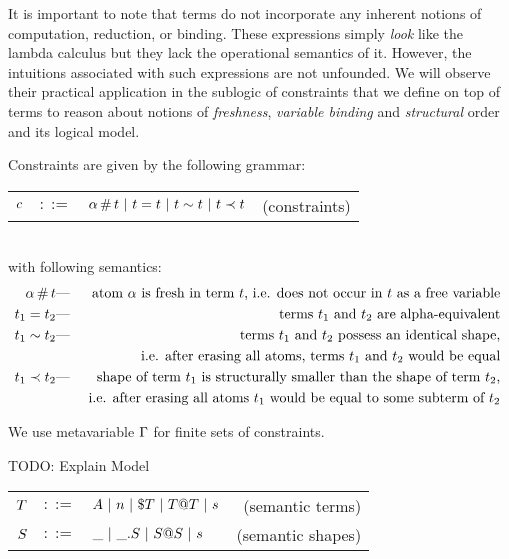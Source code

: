 \documentclass[english, mgr]{iithesis}
\begin{document}
It is important to note that terms do not incorporate any inherent notions of
computation, reduction, or binding.
These expressions simply \textit{look} like the lambda calculus but they lack
the operational semantics of it.
However, the intuitions associated with such expressions are not unfounded.
We will observe their practical application in the sublogic of constraints
that we define on top of terms to reason about
notions of \textit{freshness}, \textit{variable binding} and \textit{structural}
order and its logical model.

Constraints are given by the following grammar:
\\
\begin{tabular}{rclr}
    $c$  & $::=$ & $\alpha \,\#\, t
                   \ |\  t = t
                   \ |\  t \sim t
                   \ |\  t \prec t$
        & (constraints)
\end{tabular}
\\
with following semantics:
\begin{eqnarray*}
  \alpha \,\#\, t & \text{---} & \text{
    atom $\alpha$ is fresh in term $t$, i.e. does not occur in $t$
    as a free variable
  } \\
  t_1 = t_2 & \text{---} &\text{
    terms $t_1$ and $t_2$ are alpha-equivalent
  } \\
  t_1 \sim t_2 & \text{---} &\text{
    terms $t_1$ and $t_2$ possess an identical shape,
  } \\
  & & \text{
    i.e. after erasing all atoms, terms $t_1$ and $t_2$ would be equal
  } \\
  t_1 \prec t_2 & \text{---} &\text{
    shape of term $t_1$ is structurally smaller than the shape of term
    $t_2$,
  } \\
  & & \text{
    i.e. after erasing all atoms $t_1$ would be equal to some
    subterm of $t_2$
  } \\
\end{eqnarray*}

We use metavariable $\Gamma$ for finite sets of constraints.


TODO: Explain Model

\begin{tabular}{rclr}
$T$ & $::=$ & $A
               \ |\  n
               \ |\  \$ T
               \ |\  T @ T
               \ |\  s$
    & (semantic terms) \\
$S$   & $::=$ & $\_
               \ |\  \_. S
               \ |\  S @ S
               \ |\  s$
    & (semantic shapes)
\end{tabular}
\end{document}

